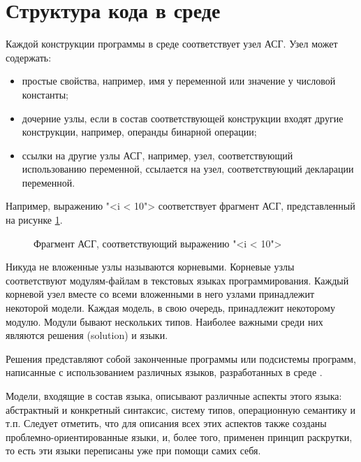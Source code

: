 \section{Структура кода в среде \MPS{}}
Каждой конструкции программы в среде \MPS{} соответствует узел АСГ. Узел может содержать:
\begin{itemize}
 \item простые свойства, например, имя у переменной или значение у числовой константы;
 \item дочерние узлы, если в состав соответствующей конструкции входят другие конструкции, например, операнды бинарной операции;
 \item ссылки на другие узлы АСГ, например, узел, соответствующий использованию переменной, ссылается на узел, соответствующий декларации переменной.
\end{itemize}

Например, выражению "<i < 10"> соответствует фрагмент АСГ, представленный на рисунке \ref{fig:Less}.
\begin{figure}
 \centering
 \caption{Фрагмент АСГ, соответствующий выражению "<i < 10">}
 \label{fig:Less}
\end{figure}

Никуда не вложенные узлы называются корневыми. Корневые узлы соответствуют модулям-файлам в текстовых языках программирования. Каждый корневой узел вместе со всеми вложенными в него узлами принадлежит некоторой модели. Каждая модель, в свою очередь, принадлежит некоторому модулю. Модули бывают нескольких типов. Наиболее важными среди них являются решения (solution) и языки.

Решения представляют собой законченные программы или подсистемы программ, написанные с использованием различных языков, разработанных в среде \MPS{}.

Модели, входящие в состав языка, описывают различные аспекты этого языка: абстрактный и конкретный синтаксис, систему типов, операционную семантику и т.п. Следует отметить, что для описания всех этих аспектов также созданы проблемно-ориентированные языки, и, более того, применен принцип раскрутки, то есть эти языки переписаны уже при помощи самих себя.

